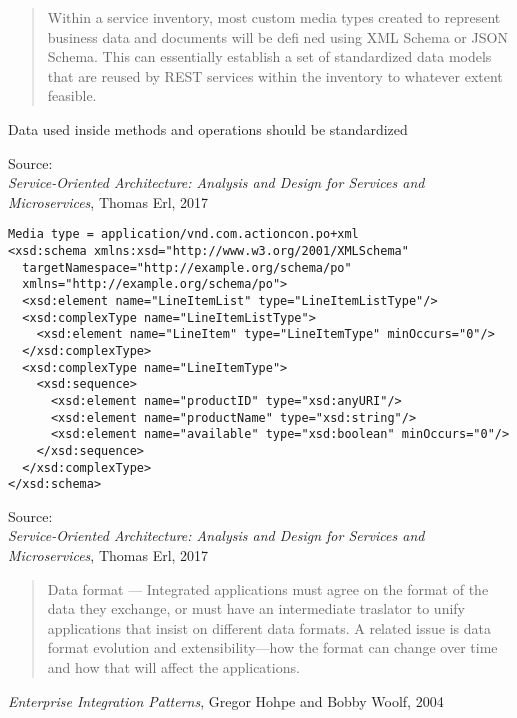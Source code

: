 \documentclass[Screen16to9,17pt]{foils}
\begin{document}


\begin{quote}
Within a service inventory, most custom media types created to represent business data and documents will be defi ned using XML Schema or JSON Schema. This can essentially establish a set of standardized data models that are reused by REST services within the inventory to whatever extent feasible.
\end{quote}

\begin{list2}
\item Data used inside methods and operations should be standardized
\end{list2}
Source: {\footnotesize\\
\emph{Service‑Oriented Architecture: Analysis and Design for Services and Microservices}, Thomas Erl, 2017}




\begin{verbatim}
Media type = application/vnd.com.actioncon.po+xml
<xsd:schema xmlns:xsd="http://www.w3.org/2001/XMLSchema"
  targetNamespace="http://example.org/schema/po"
  xmlns="http://example.org/schema/po">
  <xsd:element name="LineItemList" type="LineItemListType"/>
  <xsd:complexType name="LineItemListType">
    <xsd:element name="LineItem" type="LineItemType" minOccurs="0"/>
  </xsd:complexType>
  <xsd:complexType name="LineItemType">
    <xsd:sequence>
      <xsd:element name="productID" type="xsd:anyURI"/>
      <xsd:element name="productName" type="xsd:string"/>
      <xsd:element name="available" type="xsd:boolean" minOccurs="0"/>
    </xsd:sequence>
  </xsd:complexType>
</xsd:schema>
\end{verbatim}

Source: {\footnotesize\\
\emph{Service‑Oriented Architecture: Analysis and Design for Services and Microservices}, Thomas Erl, 2017}


\begin{quote}
Data format — Integrated applications must agree on the format of the data they exchange, or must have an intermediate traslator to unify applications that insist on different data formats. A related issue is data format evolution and extensibility—how the format can change over time and how that will affect the applications.
\end{quote}
\emph{Enterprise Integration Patterns}, Gregor Hohpe and Bobby Woolf, 2004
\end{document}
